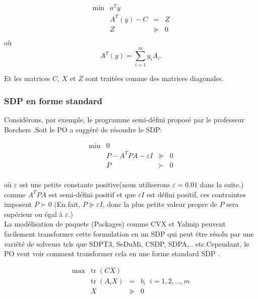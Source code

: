 \begin{equation}
\begin{array}{rrcl}
\min  & a^{T}y  & & \\
      & A^{T}(y)-C & = & Z \\
      & Z                   & \succeq & 0 \\
\end{array}
\end{equation}
où
\begin{equation}
A^{T}(y)=\sum_{i=1}^{m} y_{i}A_{i}.
\end{equation}

Et les matrices $C$, $X$ et $Z$ sont traitées comme des matrices diagonales.

\subsubsection{SDP en forme standard}
Considérons, par exemple, le programme semi-défini proposé par le professeur Borchers \cite{Borchers.B:}.Soit le PO a suggéré de résoudre le SDP:

\begin{equation}
\begin{array}{rrcl}
\min  & 0 &&  \\ 
&P - A^{T}PA - \varepsilon I & \succeq & 0 \\ 
&P &\succ & 0\\ 
\end{array}
\end{equation}
% 
% 

où $\varepsilon$ est une petite constante positive(nous utiliserons $\varepsilon = 0.01$ dans la suite.) comme $A^{T}P A$ est semi-défini positif et que $\varepsilon I$ est défini positif, ces contraintes imposent $P \succ 0$ (En fait, $P \succeq \varepsilon I $, donc la plus petite valeur propre de $P$ sera supérieur ou égal à $\varepsilon $.) \\

La modélisation de paquets (Packages) comme CVX et Yalmip peuvent facilement transformer cette formulation en un SDP qui peut être résolu par une variété de solveurs tels que SDPT3, SeDuMi, CSDP, SDPA,.. etc.Cependant, le PO veut voir comment transformer cela en une forme standard SDP \cite{Borchers.B:}.



\begin{equation}
\begin{array}{rrcl}
\max  & \mbox{tr}\; (CX)  & & \\
     &\mbox{tr}\;(A_{i}X)&=&b_{i}\;\; i=1, 2, \ldots, m \\
      & X       & \succeq & 0 \\
     
\end{array}
\end{equation}

